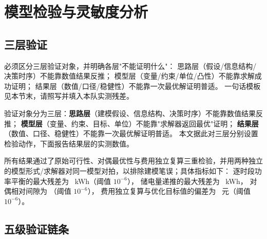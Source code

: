 
\section{模型检验与灵敏度分析}

\subsection{三层验证}

\begin{guideblock}
必须区分三层验证对象，并明确各层"不能证明什么"：
思路层（假设/信息结构/决策时序）不能靠数值结果反推；
模型层（变量/约束/单位/凸性）不能靠求解成功证明；
结果层（数值/口径/稳健性）不能靠一次最优解证明普适。
一句话模板见本节末，请照写并填入本队实测残差。
\end{guideblock}

验证对象分为三层：\textbf{思路层}（建模假设、信息结构、决策时序）不能靠数值结果反推；
\textbf{模型层}（变量、约束、目标、单位）不能靠"求解器返回最优"证明；
\textbf{结果层}（数值、口径、稳健性）不能靠一次最优解证明普适。
本文据此对三层分别设置检验动作，下面报告结果层的实测数值。

所有结果通过了原始可行性、对偶最优性与费用独立复算三重检验，并用两种独立的模型形式/求解器对同一模型对拍，以排除建模笔误；具体指标如下：
逐时段功率平衡的最大残差为 \ph~kWh（阈值 \(10^{-6}\)），
储电量递推的最大残差为 \ph~kWh，
对偶相对间隙为 \ph（阈值 \(10^{-6}\)），
费用独立复算与优化目标值的偏差为 \ph~元（阈值 \(10^{-6}\)）。

\subsection{五级验证链条}

